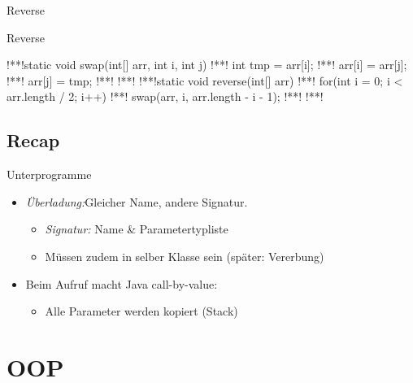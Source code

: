\begin{frame}[c]{Reverse}
\flushleft{}
%
\end{frame}
\SidebarReset

\SidebarSolution
\begin{frame}[fragile,c]{Reverse}
\begin{plainjava}
!**!static void swap(int[] arr, int i, int j) {
!**!   int tmp = arr[i];
!**!   arr[i] = arr[j];
!**!   arr[j] = tmp;
!**!}
!**!
!**!static void reverse(int[] arr) {
!**!   for(int i = 0; i < arr.length / 2; i++) {
!**!      swap(arr, i, arr.length - i - 1);
!**!   }
!**!}
\end{plainjava}
\end{frame}
\SidebarReset

\subsection{Recap}
\begin{frame}[c]{\hfill Unterprogramme}
\begin{itemize}[<+(1)->]
   \itemsep18pt
   \item \textit{Überladung:}\hfill Gleicher Name, andere Signatur. \begin{itemize}
      \item \textit{Signatur:} Name \& Parametertypliste
      \item Müssen zudem in selber Klasse sein (später: Vererbung)
   \end{itemize}
   \item Beim Aufruf macht Java call-by-value: \begin{itemize}
      \item Alle Parameter werden kopiert (Stack)
   \end{itemize}
\end{itemize}
\LargeSide
\end{frame}


\section{OOP}
